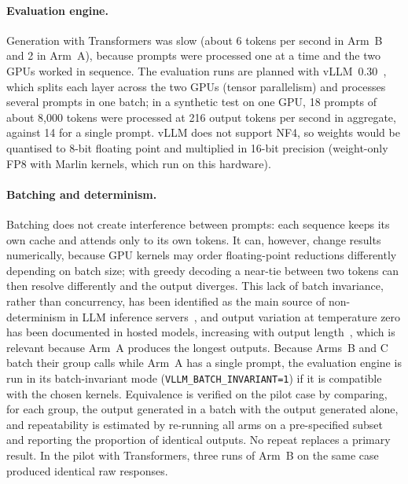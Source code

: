 \paragraph{Evaluation engine.} Generation with Transformers was slow (about 6 tokens per second in Arm~B and
2 in Arm~A), because prompts were processed one at a time and the two GPUs worked in sequence. The evaluation
runs are planned with vLLM~0.30~\cite{kwon2023vllm}, which splits each layer across the two GPUs (tensor
parallelism) and processes several prompts in one batch; in a synthetic test on one GPU, 18 prompts of about
8{,}000 tokens were processed at 216 output tokens per second in aggregate, against 14 for a single prompt.
vLLM does not support NF4, so weights would be quantised to 8-bit floating point and multiplied in 16-bit
precision (weight-only FP8 with Marlin kernels, which run on this hardware). 

\paragraph{Batching and determinism.} Batching does not create interference between prompts: each sequence
keeps its own cache and attends only to its own tokens. It can, however, change results numerically, because
GPU kernels may order floating-point reductions differently depending on batch size; with greedy decoding a
near-tie between two tokens can then resolve differently and the output diverges. This lack of batch
invariance, rather than concurrency, has been identified as the main source of non-determinism in LLM
inference servers~\cite{thinkingmachines2025nondeterminism}, and output variation at temperature zero has been
documented in hosted models, increasing with output length~\cite{atil2024nondeterminism}, which is relevant
because Arm~A produces the longest outputs. Because Arms~B and C batch their
group calls while Arm~A has a single prompt, the evaluation engine is run in its batch-invariant mode
(\texttt{VLLM\_BATCH\_INVARIANT=1}) if it is compatible with the chosen kernels. Equivalence is verified on the
pilot case by comparing, for each group, the output generated in a batch with the output generated alone,
and repeatability is estimated by re-running all arms on a pre-specified subset  and reporting the proportion of identical outputs. No repeat replaces a primary result. In the
pilot with Transformers, three runs of Arm~B on the same case produced identical raw responses.

